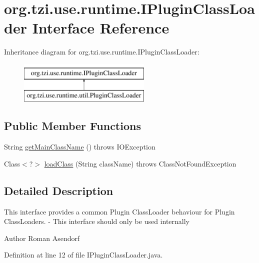 \hypertarget{interfaceorg_1_1tzi_1_1use_1_1runtime_1_1_i_plugin_class_loader}{\section{org.\-tzi.\-use.\-runtime.\-I\-Plugin\-Class\-Loader Interface Reference}
\label{interfaceorg_1_1tzi_1_1use_1_1runtime_1_1_i_plugin_class_loader}
}
Inheritance diagram for org.\-tzi.\-use.\-runtime.\-I\-Plugin\-Class\-Loader\-:\begin{figure}[H]
\begin{center}
\leavevmode
\includegraphics[height=2.000000cm]{interfaceorg_1_1tzi_1_1use_1_1runtime_1_1_i_plugin_class_loader}
\end{center}
\end{figure}
\subsection*{Public Member Functions}
\begin{DoxyCompactItemize}
\item 
String \hyperlink{interfaceorg_1_1tzi_1_1use_1_1runtime_1_1_i_plugin_class_loader_a0e871be0a20d62042085819b426ecad2}{get\-Main\-Class\-Name} ()  throws I\-O\-Exception
\item 
Class$<$?$>$ \hyperlink{interfaceorg_1_1tzi_1_1use_1_1runtime_1_1_i_plugin_class_loader_a4ce9a892243007bc18dba3f43ab7fed9}{load\-Class} (String class\-Name)  throws Class\-Not\-Found\-Exception
\end{DoxyCompactItemize}


\subsection{Detailed Description}
This interface provides a common Plugin Class\-Loader behaviour for Plugin Class\-Loaders. -\/ This interface should only be used internally

\begin{DoxyAuthor}{Author}
Roman Asendorf 
\end{DoxyAuthor}


Definition at line 12 of file I\-Plugin\-Class\-Loader.\-java.



